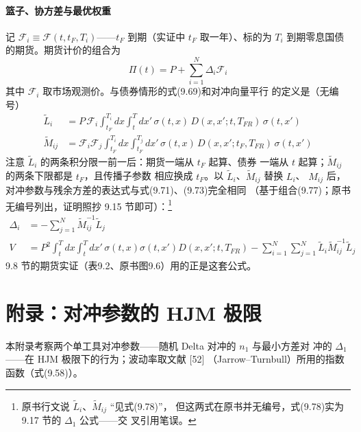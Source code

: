 \paragraph{篮子、协方差与最优权重}
记 $\mathcal{F}_i\equiv\mathcal{F}(t,t_F,T_i)$——$t_F$ 到期（实证中
$t_F$ 取一年）、标的为 $T_i$ 到期零息国债的期货。期货计价的组合为
\begin{equation*}
\Pi(t)=P+\sum_{i=1}^{N}\Delta_i\mathcal{F}_i\tag{9.77}
\end{equation*}
其中 $\mathcal{F}_i$ 取市场观测价。与债券情形的式(9.69)和对冲向量平行
的定义是（无编号）
\begin{align*}
\tilde{L}_i&=P\,\mathcal{F}_i\int_{t_F}^{T_i}dx\int_{t}^{T}dx'\,
\sigma(t,x)\,D(x,x';t,T_{FR})\,\sigma(t,x')\\
\tilde{M}_{ij}&=\mathcal{F}_i\mathcal{F}_j\int_{t_F}^{T_i}dx\int_{t_F}^{T_j}dx'\,
\sigma(t,x)\,D(x,x';t_F,T_{FR})\,\sigma(t,x')
\end{align*}
注意 $\tilde{L}_i$ 的两条积分限一前一后：期货一端从 $t_F$ 起算、债券
一端从 $t$ 起算；$\tilde{M}_{ij}$ 的两条下限都是 $t_F$，且传播子参数
相应换成 $t_F$。以 $\tilde{L}_i$、$\tilde{M}_{ij}$ 替换 $L_i$、
$M_{ij}$ 后，对冲参数与残余方差的表达式与式(9.71)、(9.73)完全相同
（基于组合(9.77)；原书无编号列出，证明照抄 9.15 节即可）：\footnote{原书行文说 $\tilde{L}_i$、$\tilde{M}_{ij}$ “见式(9.78)”，
但这两式在原书并无编号，式(9.78)实为 9.17 节的 $\Delta_1$ 公式——交
叉引用笔误。}
\begin{align*}
\Delta_i&=-\sum_{j=1}^{N}\tilde{M}^{-1}_{ij}\tilde{L}_j\\
V&=P^2\int_{t}^{T}dx\int_{t}^{T}dx'\,\sigma(t,x)\sigma(t,x')
D(x,x';t,T_{FR})
-\sum_{i=1}^{N}\sum_{j=1}^{N}\tilde{L}_i\tilde{M}^{-1}_{ij}\tilde{L}_j
\end{align*}9.8 节的期货实证（表9.2、原书图9.6）用的正是这套公式。

\section{附录：对冲参数的 HJM 极限}

本附录考察两个单工具对冲参数——随机 Delta 对冲的 $n_1$ 与最小方差对
冲的 $\Delta_1$——在 HJM 极限下的行为；波动率取文献 [52]
（Jarrow--Turnbull）所用的指数函数（式(9.58)）。

